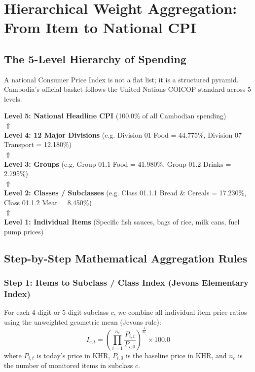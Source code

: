 \documentclass[11pt,a4paper,oneside]{article}
\begin{document}
\section{Hierarchical Weight Aggregation: From Item to National CPI}

\subsection{The 5-Level Hierarchy of Spending}
A national Consumer Price Index is not a flat list; it is a structured pyramid. Cambodia's official basket follows the United Nations COICOP standard across 5 levels:

\begin{center}
\begin{tcolorbox}[colback=white,colframe=NavyBlue,width=0.92\textwidth,title=\bfseries The 5 Levels of the CPI Pyramid]
\centering
\textbf{Level 5: National Headline CPI} (100.0\% of all Cambodian spending)\\
$\Uparrow$\\
\textbf{Level 4: 12 Major Divisions} (e.g. Division 01 Food = 44.775\%, Division 07 Transport = 12.180\%)\\
$\Uparrow$\\
\textbf{Level 3: Groups} (e.g. Group 01.1 Food = 41.980\%, Group 01.2 Drinks = 2.795\%)\\
$\Uparrow$\\
\textbf{Level 2: Classes / Subclasses} (e.g. Class 01.1.1 Bread \& Cereals = 17.230\%, Class 01.1.2 Meat = 8.450\%)\\
$\Uparrow$\\
\textbf{Level 1: Individual Items} (Specific fish sauces, bags of rice, milk cans, fuel pump prices)
\end{tcolorbox}
\end{center}

\subsection{Step-by-Step Mathematical Aggregation Rules}

\subsubsection{Step 1: Items to Subclass / Class Index (Jevons Elementary Index)}
For each 4-digit or 5-digit subclass $c$, we combine all individual item price ratios using the unweighted geometric mean (Jevons rule):
\begin{equation}
I_{c, t} = \left( \prod_{i=1}^{n_c} \frac{P_{i, t}}{P_{i, 0}} \right)^{\frac{1}{n_c}} \times 100.0
\end{equation}
where $P_{i, t}$ is today's price in KHR, $P_{i, 0}$ is the baseline price in KHR, and $n_c$ is the number of monitored items in subclass $c$.
\end{document}

